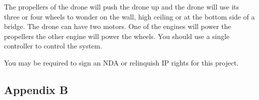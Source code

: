 \documentclass[12pt]{article}
\begin{document}
                The propellers of the drone will push the drone up and the drone will use its three or four wheels to wonder on the wall, high ceiling or at the bottom side of a bridge.
                The drone can have two motors.
                One of the engines will power the propellers the other engine will power the wheels.
                You should use a single controller to control the system.

                You may be required to sign an NDA or relinquish IP rights for this project.
        
        \newpage
        \subsection{Appendix B}
            \newcommand{\ieeestd}[3]{
                \noindent\textbf{#1} \\
                \noindent\url{#2} \\
                \noindent#3 \\
                \vspace{0.5cm}

            }
\end{document}
